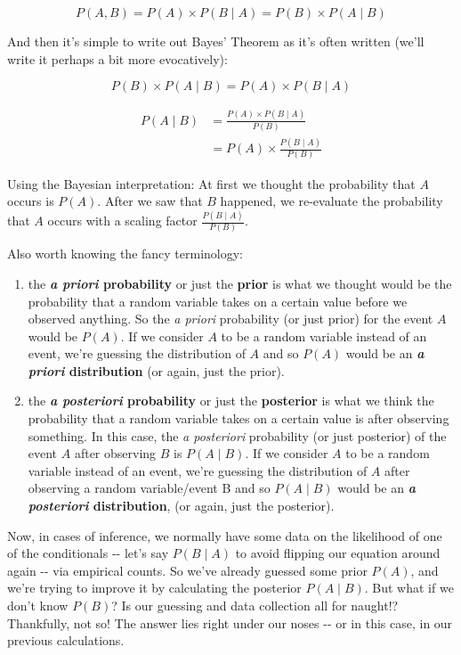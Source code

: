 \documentclass[letterpaper,12pt]{report}
\providecommand{\tightlist}{%
  \setlength{\itemsep}{0pt}\setlength{\parskip}{0pt}}
\begin{document}
\[ P(A,B) = P(A) \times P(B \mid A) = P(B) \times P(A \mid B) \]

And then it's simple to write out Bayes' Theorem as it's often written
(we'll write it perhaps a bit more evocatively):

\[ P(B) \times P(A \mid B) = P(A) \times P(B \mid A) \]

\[\begin{split} P(A \mid B) &= \frac{P(A) \times P(B \mid A)} {P(B)} \\
                        &= P(A) \times \frac {P(B \mid A)} {P(B)} \end{split}\]

Using the Bayesian interpretation: At first we thought the probability
that \(A\) occurs is \(P(A)\). After we saw that \(B\) happened, we
re-evaluate the probability that \(A\) occurs with a scaling factor \(
\frac {P(B \mid A)} {P(B)} \).

Also worth knowing the fancy terminology: 
\begin{enumerate}
  \tightlist
  \item
  the \textbf{\textit{a priori} probability} or just the \textbf{prior} 
  is what 
  we thought would be the
  probability that a random variable takes on a certain value before we
  observed anything. So the \emph{a priori} probability (or just prior)
  for the event \(A\) would be \(P(A)\). If we consider \(A\) to be a
  random variable instead of an event, we're guessing the distribution of
  \(A\) and so \(P(A)\) would be an \textbf{\textit{a priori} distribution}
  (or again, just the prior). 
  \item
  the \textbf{\textit{a posteriori}
  probability} or just the \textbf{posterior}
  is what we think the
  probability that a random variable takes on a certain value is after
  observing something. In this case, the \emph{a posteriori} probability
  (or just posterior) of the event \(A\) after observing \(B\) is
  \(P(A \mid B)\). If we consider \(A\) to be a random variable instead of
  an event, we're guessing the distribution of \(A\) after observing a
  random variable/event B and so \(P(A \mid B)\) would be an
  \textbf{\textit{a posteriori} distribution}, (or again, just the
  posterior).
\end{enumerate}
Now, in cases of inference, we normally have some data on the likelihood
of one of the conditionals -\/- let's say \(P(B \mid A)\) to avoid
flipping our equation around again -\/- via empirical counts. So we've
already guessed some prior \(P(A)\), and we're trying to improve it by
calculating the posterior \( P(A \mid B) \). But what if we don't know
\( P(B) \)? Is our guessing and data collection all for naught!?
Thankfully, not so! The answer lies right under our noses -\/- or in
this case, in our previous calculations.
\end{document}
